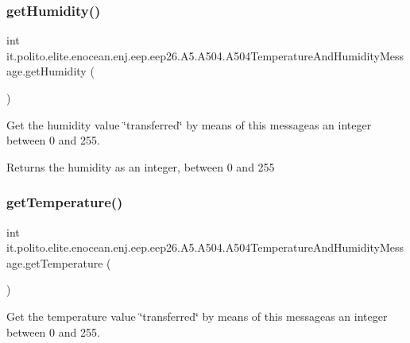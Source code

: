 \subsubsection{\texorpdfstring{get\+Humidity()}{getHumidity()}}
{\footnotesize\ttfamily int it.\+polito.\+elite.\+enocean.\+enj.\+eep.\+eep26.\+A5.\+A504.\+A504\+Temperature\+And\+Humidity\+Message.\+get\+Humidity (\begin{DoxyParamCaption}{ }\end{DoxyParamCaption})}

Get the humidity value \char`\"{}transferred\char`\"{} by means of this messageas an integer between 0 and 255.

\begin{DoxyReturn}{Returns}
the humidity as an integer, between 0 and 255 
\end{DoxyReturn}
\hypertarget{classit_1_1polito_1_1elite_1_1enocean_1_1enj_1_1eep_1_1eep26_1_1_a5_1_1_a504_1_1_a504_temperature_and_humidity_message_ae3fcde9b6d70ca2067670f89510deb42}{}\label{classit_1_1polito_1_1elite_1_1enocean_1_1enj_1_1eep_1_1eep26_1_1_a5_1_1_a504_1_1_a504_temperature_and_humidity_message_ae3fcde9b6d70ca2067670f89510deb42} 
\subsubsection{\texorpdfstring{get\+Temperature()}{getTemperature()}}
{\footnotesize\ttfamily int it.\+polito.\+elite.\+enocean.\+enj.\+eep.\+eep26.\+A5.\+A504.\+A504\+Temperature\+And\+Humidity\+Message.\+get\+Temperature (\begin{DoxyParamCaption}{ }\end{DoxyParamCaption})}

Get the temperature value \char`\"{}transferred\char`\"{} by means of this messageas an integer between 0 and 255.

